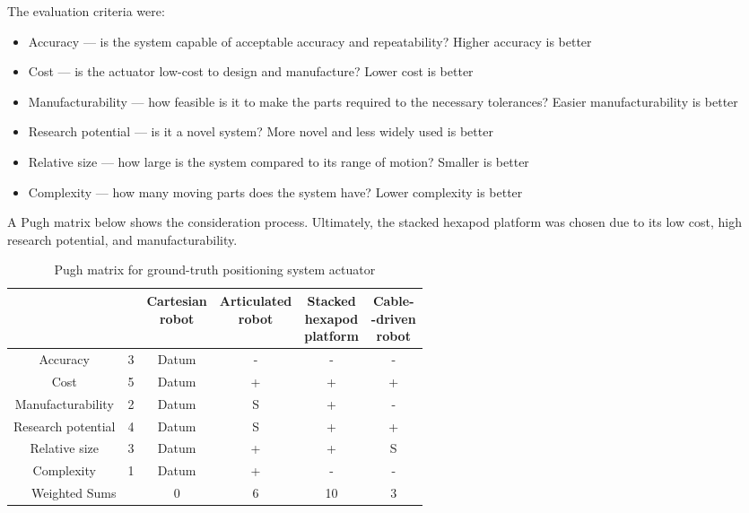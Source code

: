 \documentclass[11pt]{ucthesisCP}
\begin{document}
\vspace{2ex}
\noindent The evaluation criteria were:

\begin{itemize}[noitemsep,topsep=0pt,]
	\item Accuracy --- is the system capable of acceptable accuracy and repeatability? Higher accuracy is better
	\item Cost --- is the actuator low-cost to design and manufacture? Lower cost is better
	\item Manufacturability --- how feasible is it to make the parts required to the necessary tolerances? Easier manufacturability is better
	\item Research potential --- is it a novel system? More novel and less widely used is better
	\item Relative size --- how large is the system compared to its range of motion? Smaller is better
	\item Complexity --- how many moving parts does the system have? Lower complexity is better
\end{itemize}

\noindent A Pugh matrix below shows the consideration process. Ultimately, the stacked hexapod platform was chosen due to its low cost, high research potential, and manufacturability. 

\begin{table}[htbp]
	\centering
	\caption{Pugh matrix for ground-truth positioning system actuator}
	\label{tab:pughmatrix}
	\begin{tabular}{|c|c|c|c|c|c|}
		\hline
		\makecell{Criteria} & \makecell{Weight} & \makecell{Cartesian\\robot} & \makecell{Articulated\\robot} & \makecell{Stacked\\hexapod\\platform} & \makecell{Cable-\\-driven\\robot} \\
		\hline
		Accuracy & 3 & Datum & - & - & - \\
		\hline
		Cost & 5 & Datum & + & + & + \\
		\hline
		Manufacturability & 2 & Datum & S & + & - \\
		\hline
		Research potential & 4 & Datum & S & + & + \\
		\hline
		Relative size & 3 & Datum & + & + & S \\
		\hline
		Complexity & 1 & Datum & + & - & - \\
		\hline
		\multicolumn{2}{|c|}{Weighted Sums} & 0 & 6 & 10 & 3 \\
		\hline
	\end{tabular}
\end{table}
\end{document}
